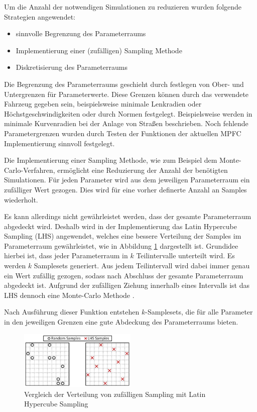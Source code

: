 Um die Anzahl der notwendigen Simulationen zu reduzieren wurden folgende Strategien angewendet:
\begin{itemize}
    \item sinnvolle Begrenzung des Parameterraums
    \item Implementierung einer (zufälligen) Sampling Methode
    \item Diskretisierung des Parameterraums
\end{itemize}
Die Begrenzung des Parameterraums geschieht durch festlegen von Ober- und Untergrenzen für Parameterwerte. Diese Grenzen können durch das verwendete Fahrzeug gegeben sein, beispielsweise minimale Lenkradien oder Höchstgeschwindigkeiten oder durch Normen festgelegt. Beispielsweise werden in \cite{Bau2019} minimale Kurvenradien bei der Anlage von Straßen beschrieben. Noch fehlende Parametergrenzen wurden durch Testen der Funktionen der aktuellen MPFC Implementierung sinnvoll festgelegt.

Die Implementierung einer Sampling Methode, wie zum Beispiel dem Monte-Carlo-Verfahren, ermöglicht eine Reduzierung der Anzahl der benötigten Simulationen. Für jeden Parameter wird aus dem jeweiligen Parameterraum ein zufälliger Wert gezogen. Dies wird für eine vorher definerte Anzahl an Samples wiederholt.

Es kann allerdings nicht gewährleistet werden, dass der gesamte Parameterraum abgedeckt wird. Deshalb wird in der Implementierung das Latin Hypercube Sampling (LHS) angewendet, welches eine bessere Verteilung der Samples im Parameterraum gewährleistet, wie in Abbildung \ref{fig:Random_vs_LHS} dargestellt ist. Grundidee hierbei ist, dass jeder Parameterraum in $k$ Teilintervalle unterteilt wird. Es werden $k$ Samplesets generiert. Aus jedem Teilintervall wird dabei immer genau ein Wert zufällig gezogen, sodass nach Abschluss der gesamte Parameterraum abgedeckt ist. Aufgrund der zufälligen Ziehung innerhalb eines Intervalls ist das LHS dennoch eine Monte-Carlo Methode \cite{McKay1979}.\bigskip

\noindent Nach Ausführung dieser Funktion entstehen $k$-Samplesets, die für alle Parameter in den jeweiligen Grenzen eine gute Abdeckung des Parameterraums bieten.

\begin{figure}[ht]
    \centering
    \includegraphics[width=0.5\textwidth]{figures/3_Implementierung/LHS_random_compare.png}
    \caption{Vergleich der Verteilung von zufälligen Sampling mit Latin Hypercube Sampling \cite{Preece2015}}
    \label{fig:Random_vs_LHS}
\end{figure}

